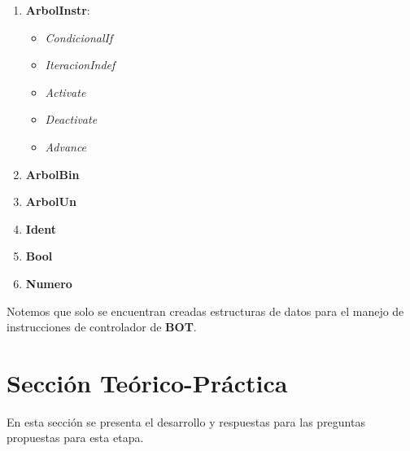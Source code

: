 \documentclass[a4paper, 10pt]{article}
\begin{document}
			\begin{enumerate}
				\item \textbf{ArbolInstr}:
				\begin{itemize}
					\item \textit{CondicionalIf}
					\item \textit{IteracionIndef}
					\item \textit{Activate}
					\item \textit{Deactivate}
					\item \textit{Advance}					
				\end{itemize}							
				\item \textbf{ArbolBin}
				\item \textbf{ArbolUn}
				\item \textbf{Ident}
				\item \textbf{Bool}
				\item \textbf{Numero}\\
			\end{enumerate}
			
			Notemos que solo se encuentran creadas estructuras de datos para el manejo de instrucciones de
			controlador de \textbf{BOT}.
	
	\newpage			
	\section{Sección Teórico-Práctica}
		
		\par
		\medskip
		En esta sección se presenta el desarrollo y respuestas para las preguntas propuestas para esta 
		etapa.
		
\end{document}

